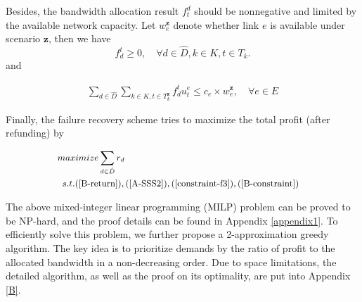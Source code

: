 \documentclass[sigconf]{acmart}
\begin{document}

Besides, the bandwidth allocation result $f_t^d$ should be nonnegative
and limited by the available network capacity. 
Let $w_e^{ \mathbf{z}}$ denote whether link $e$ is available under scenario $ \mathbf{z}$, 
then we have 
\begin{equation}
f^{t}_{d} \ge 0, \quad\forall d \in \hat{D} ,  k\in K,  t\in T_k.
\label{constraint-f3}
\end{equation}
and 
\begin{small}
\begin{eqnarray} \label{B-constraint}
\sum_{d\in \hat{D}}\sum_{k\in K, t\in T^{ \mathbf{z}}_k} f^{t}_{d}u_t^e \le c_e \times w_e^{ \mathbf{z}}, \quad \forall e \in E
\end{eqnarray}
\end{small}

Finally, the failure recovery scheme tries to maximize the total profit (after refunding) by 

\begin{equation}
\small
\begin{aligned} \label{BATE-recovery}
 &maximize  \sum_{d\in \hat{D}} r_d\\
&\begin{array}{r@{\quad}r@{}l@{\quad}l}
s.t.  (\ref{B-return}), (\ref{A-SSS2}), (\ref{constraint-f3}), (\ref{B-constraint})
\end{array}
\end{aligned}
\end{equation}

The above mixed-integer linear programming  (MILP) problem can be proved to be NP-hard, 
and the proof details can be found in Appendix \ref{appendix1}.
To efficiently solve this problem, we further propose a 2-approximation greedy algorithm.
The key idea is to prioritize demands by the ratio of profit to the allocated bandwidth in a non-decreasing order.
Due to space limitations, the detailed algorithm, as well as the proof on its optimality, 
are put into Appendix \ref{B}.
\end{document}
